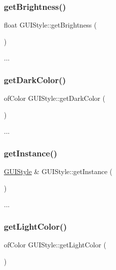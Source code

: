 \subsubsection{\texorpdfstring{get\+Brightness()}{getBrightness()}}
{\footnotesize\ttfamily float G\+U\+I\+Style\+::get\+Brightness (\begin{DoxyParamCaption}{ }\end{DoxyParamCaption})}

... \mbox{\label{class_g_u_i_style_aa2c6ac1c7d7671c14f04884137254661}} 
\subsubsection{\texorpdfstring{get\+Dark\+Color()}{getDarkColor()}}
{\footnotesize\ttfamily of\+Color G\+U\+I\+Style\+::get\+Dark\+Color (\begin{DoxyParamCaption}{ }\end{DoxyParamCaption})}

... \mbox{\label{class_g_u_i_style_a1fec60550b47121fb9c514f8dfe4337f}} 
\subsubsection{\texorpdfstring{get\+Instance()}{getInstance()}}
{\footnotesize\ttfamily \hyperlink{class_g_u_i_style}{G\+U\+I\+Style} \& G\+U\+I\+Style\+::get\+Instance (\begin{DoxyParamCaption}{ }\end{DoxyParamCaption})\hspace{0.3cm}{\ttfamily [static]}}

... \mbox{\label{class_g_u_i_style_a3efdd51e19fc2ee1da71a52dce9240c8}} 
\subsubsection{\texorpdfstring{get\+Light\+Color()}{getLightColor()}}
{\footnotesize\ttfamily of\+Color G\+U\+I\+Style\+::get\+Light\+Color (\begin{DoxyParamCaption}{ }\end{DoxyParamCaption})}

